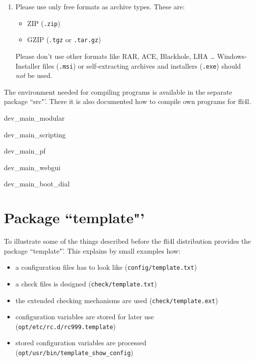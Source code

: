 \begin{enumerate}
    \item Please use only free formats as archive types. These are:
    \begin{itemize}
      \item ZIP  (\texttt{.zip})
      \item GZIP (\texttt{.tgz} or \texttt{.tar.gz})
    \end{itemize}
    Please don't use other formats like RAR, ACE, Blackhole, LHA \ldots
    Windows-Installer files (\texttt{.msi}) or self-extracting archives and
    installers (\texttt{.exe}) should \emph{not} be used.
  \end{enumerate}


The environment needed for compiling programs is available in the separate
package ``src"'. There it is also documented how to compile own programs for fli4l.

 {dev_main_modular}

 {dev_main_scripting}

 {dev_main_pf}

 {dev_main_webgui}

 {dev_main_boot_dial}

\section{Package ``template"'}

To illustrate some of the things described before the fli4l distribution provides the package
``template"'. This explains by small examples how:

\begin{itemize}
\item a configuration files has to look like (\texttt{config/template.txt})
\item a check files is designed (\texttt{check/template.txt})
\item the extended checking mechanisms are used (\texttt{check/template.ext})
\item configuration variables are stored for later use \\(\texttt{opt/etc/rc.d/rc999.template})
\item stored configuration variables are processed \\(\texttt{opt/usr/bin/template\_show\_config})
\end{itemize}



